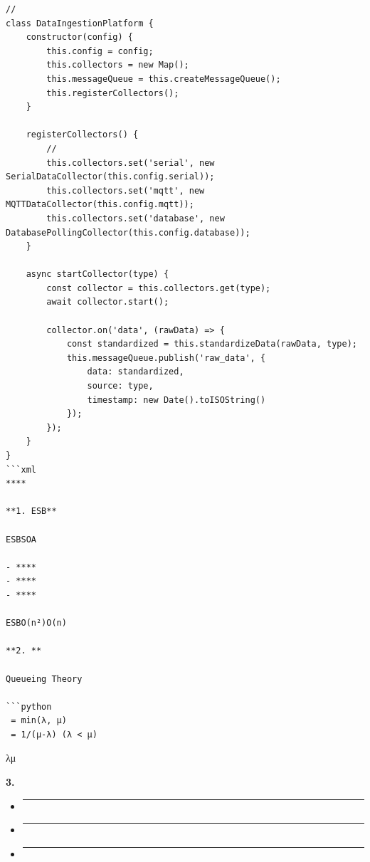 \begin{verbatim}
// 
class DataIngestionPlatform {
    constructor(config) {
        this.config = config;
        this.collectors = new Map();
        this.messageQueue = this.createMessageQueue();
        this.registerCollectors();
    }
    
    registerCollectors() {
        // 
        this.collectors.set('serial', new SerialDataCollector(this.config.serial));
        this.collectors.set('mqtt', new MQTTDataCollector(this.config.mqtt));
        this.collectors.set('database', new DatabasePollingCollector(this.config.database));
    }
    
    async startCollector(type) {
        const collector = this.collectors.get(type);
        await collector.start();
        
        collector.on('data', (rawData) => {
            const standardized = this.standardizeData(rawData, type);
            this.messageQueue.publish('raw_data', {
                data: standardized,
                source: type,
                timestamp: new Date().toISOString()
            });
        });
    }
}
```xml
****

**1. ESB**

ESBSOA

- ****
- ****
- ****

ESBO(n²)O(n)

**2. **

Queueing Theory

```python
 = min(λ, μ)
 = 1/(μ-λ) (λ < μ)
\end{verbatim}

λμ

\textbf{3. }

\begin{itemize}
\item
  \begin{center}\rule{0.5\linewidth}{0.5pt}\end{center}
\item
  \begin{center}\rule{0.5\linewidth}{0.5pt}\end{center}
\item
  \begin{center}\rule{0.5\linewidth}{0.5pt}\end{center}
\end{itemize}

\subsubsection{}\label{section-39}

